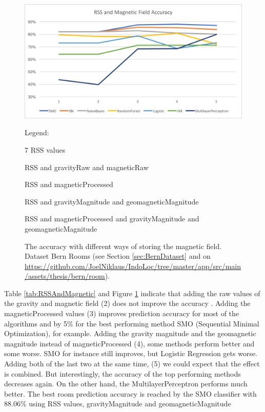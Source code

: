 \begin{figure}[H]
\centering
\includegraphics[width=150mm]{Figures/RSSAndMagnetic.png}
\decoRule
\caption[RSSAndMagnetic]{The accuracy with different ways of storing the magnetic field. Dataset Bern Rooms (see Section \ref{sec:BernDataset} and on \url{https://github.com/JoelNiklaus/IndoLoc/tree/master/app/src/main/assets/thesis/bern/room}).}
\label{fig:RSSAndMagnetic}
	
	\begin{threeparttable}
    \begin{tablenotes}
  \item Legend:
\item[1] 7 RSS values
\item[2] RSS and gravityRaw and magneticRaw
\item[3] RSS and magneticProcessed
\item[4] RSS and gravityMagnitude and geomagneticMagnitude
\item[5] RSS and magneticProcessed and gravityMagnitude and geomagneticMagnitude
    \end{tablenotes}
	\end{threeparttable}

\end{figure}




Table \ref{tab:RSSAndMagnetic} and Figure \ref{fig:RSSAndMagnetic} indicate that adding the raw values of the gravity and magnetic field (2) does not improve the accuracy . Adding the magneticProcessed values (3) improves prediction accuracy for most of the algorithms and by 5\% for the best performing method SMO (Sequential Minimal Optimization), for example. Adding the gravity magnitude and the geomagnetic magnitude instead of magneticProcessed (4), some methods perform better and some worse. SMO for instance still improves, but Logistic Regression gets worse. Adding both of the last two at the same time, (5) we could expect that the effect is combined. But interestingly, the accuracy of the top performing methods decreases again. On the other hand, the MultilayerPerceptron performs much better. 
The best room prediction accuracy is reached by the SMO classifier with 88.06\% using RSS values, gravityMagnitude and geomagneticMagnitude





